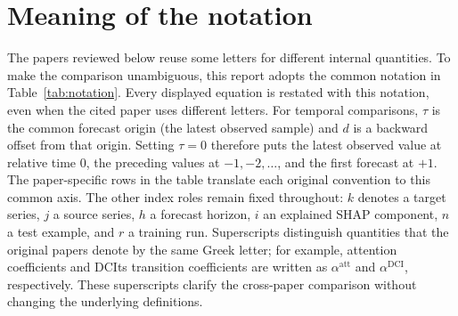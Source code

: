 \section*{Meaning of the notation}

The papers reviewed below reuse some letters for different internal
quantities. To make the comparison unambiguous, this report adopts the common
notation in Table~\ref{tab:notation}. Every displayed equation is restated with
this notation, even when the cited paper uses different letters. For temporal
comparisons, $\tau$ is the common forecast origin (the latest observed sample)
and $d$ is a backward offset from that origin. Setting $\tau=0$ therefore puts
the latest observed value at relative time $0$, the preceding values at
$-1,-2,\ldots$, and the first forecast at $+1$. The paper-specific rows in the
table translate each original convention to this common axis. The other index
roles remain fixed throughout: $k$ denotes a target series, $j$ a source
series, $h$ a forecast horizon, $i$ an explained SHAP component, $n$ a test
example, and $r$ a training run. Superscripts distinguish quantities that the
original papers denote by the same Greek letter; for example, attention
coefficients and DCIts transition coefficients are written as
$\alpha^{\mathrm{att}}$ and $\alpha^{\mathrm{DCI}}$, respectively. These
superscripts clarify the cross-paper comparison without changing the
underlying definitions.

